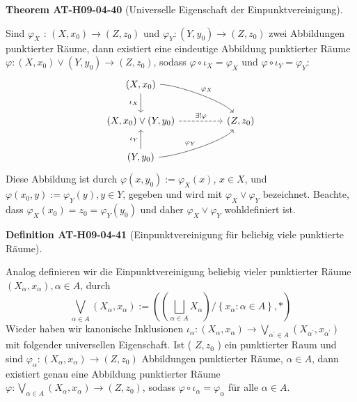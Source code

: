 \documentclass[10pt, letterpaper]{article}
\newcommand{\CustomHeading}[3]{%
  \par\medskip\noindent%
  \textbf{#1 #2} \textnormal{(#3)}.\enskip%
}
\newenvironment{DEF}[2]{\begin{unitbox}\CustomHeading{Definition}{#1}{#2}}{\end{unitbox}}
\newenvironment{THEO}[2]{\begin{unitbox}\CustomHeading{Theorem}{#1}{#2}}{\end{unitbox}}
\begin{document}
\begin{THEO}{AT-H09-04-40}{Universelle Eigenschaft der Einpunktvereinigung}
Sind $\varphi_{X}$ : $\left(X, x_{0}\right) \rightarrow\left(Z, z_{0}\right)$ und $\varphi_{Y}:\left(Y, y_{0}\right) \rightarrow\left(Z, z_{0}\right)$ zwei Abbildungen punktierter Räume, dann existiert eine eindeutige Abbildung punktierter Räume $\varphi:\left(X, x_{0}\right) \vee\left(Y, y_{0}\right) \rightarrow\left(Z, z_{0}\right)$, sodass $\varphi \circ \iota_{X}=\varphi_{X}$ und $\varphi \circ \iota_{Y}=\varphi_{Y}$: 
\[
\begin{tikzcd}[row sep=2em, column sep=4.5em]
(X, x_0) \arrow[dr, "\varphi_X", out=1, in=130, looseness=0.5] \arrow[d, "\iota_X"'] & \\
(X, x_0) \vee (Y, y_0) \arrow[r, "\exists ! \varphi", dashed] & (Z, z_0) \\
(Y, y_0) \arrow[u, "\iota_Y"] \arrow[ur, "\varphi_Y", out=1, in=230, looseness=0.5] &
\end{tikzcd}
\]
Diese Abbildung ist durch $\varphi\left(x, y_{0}\right):=\varphi_{X}(x)$, $x \in X$, und $\varphi\left(x_{0}, y\right):=\varphi_{Y}(y), y \in Y$, gegeben und wird mit $\varphi_{X} \vee \varphi_{Y}$ bezeichnet. Beachte, dass $\varphi_{X}\left(x_{0}\right)=z_{0}=\varphi_{Y}\left(y_{0}\right)$ und daher $\varphi_{X} \vee \varphi_{Y}$ wohldefiniert ist.
\end{THEO}


\begin{DEF}{AT-H09-04-41}{Einpunktvereinigung für beliebig viele punktierte Räume}
Analog definieren wir die Einpunktvereinigung beliebig vieler punktierter Räume $\left(X_{\alpha}, x_{\alpha}\right), \alpha \in A$, durch
$$
\bigvee_{\alpha \in A}\left(X_{\alpha}, x_{\alpha}\right):=\left(\left(\bigsqcup_{\alpha \in A} X_{\alpha}\right) /\left\{x_{\alpha}: \alpha \in A\right\}, *\right)
$$
Wieder haben wir kanonische Inklusionen $\iota_{\alpha}:\left(X_{\alpha}, x_{\alpha}\right) \rightarrow \bigvee_{\alpha^{\prime} \in A}\left(X_{\alpha^{\prime}}, x_{\alpha^{\prime}}\right)$ mit folgender universellen Eigenschaft. Ist ( $Z, z_{0}$ ) ein punktierter Raum und sind $\varphi_{\alpha}:\left(X_{\alpha}, x_{\alpha}\right) \rightarrow\left(Z, z_{0}\right)$ Abbildungen punktierter Räume, $\alpha \in A$, dann existiert genau eine Abbildung punktierter Räume $\varphi: \bigvee_{\alpha \in A}\left(X_{\alpha}, x_{\alpha}\right) \rightarrow\left(Z, z_{0}\right)$, sodass $\varphi \circ \iota_{\alpha}=\varphi_{\alpha}$ für alle $\alpha \in A$.
\end{DEF}
\end{document}
